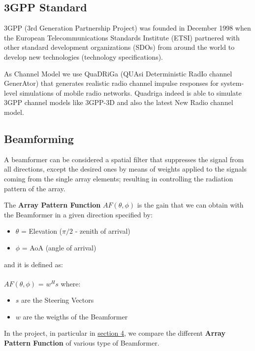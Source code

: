 \subsection{3GPP Standard}

3GPP (3rd Generation Partnership Project) was founded in December 1998 when the European 
Telecommunications Standards Institute (ETSI) 
partnered with other standard development organizations (SDOs) 
from around the world to develop new technologies (technology specifications).

As Channel Model we use QuaDRiGa (QUAsi Deterministic RadIo channel GenerAtor) that 
generates realistic radio channel impulse responses for system-level simulations of mobile radio networks. 
Quadriga indeed is able to simulate 3GPP channel models like 3GPP-3D and also the latest New Radio channel model.


\subsection{Beamforming}

A beamformer can be considered a spatial filter that suppresses
the signal from all directions, except the desired ones by means 
of weights applied to the signals coming from the single array elements;
resulting in controlling the radiation pattern of the array.

The \textbf{Array Pattern Function} $AF(\theta,\phi)$ is the gain that we can obtain with the 
Beamformer in a given direction specified by:

\begin{itemize}
    \item $\theta$ = Elevation ($\pi/2$ - zenith of arrival)
    \item $\phi$ = AoA (angle of arrival)
\end{itemize}

and it is defined as: \\\\
$AF(\theta,\phi)$ = $w^Hs$ where:
\begin{itemize}
    \item $s$ are the Steering Vectors
    \item $w$ are the weigths of the Beamformer
\end{itemize}

In the project, in particular in \hyperref[sec:antenna_array_comparison]{section 4}, we compare the different \textbf{Array Pattern Function} 
of various type of Beamformer.
